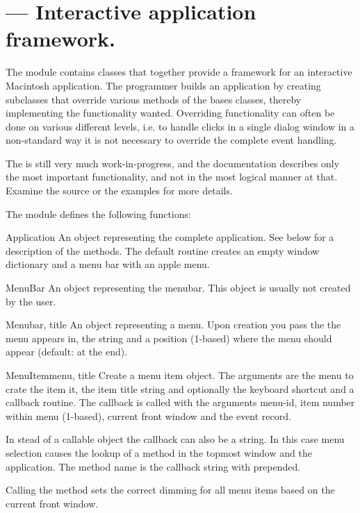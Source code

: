 \section{ ---
         Interactive application framework.}



The  module contains classes that together provide a
framework for an interactive Macintosh application. The programmer
builds an application by creating subclasses that override various
methods of the bases classes, thereby implementing the functionality
wanted. Overriding functionality can often be done on various
different levels, i.e. to handle clicks in a single dialog window in a
non-standard way it is not necessary to override the complete event
handling.

The  is still very much work-in-progress, and the
documentation describes only the most important functionality, and not
in the most logical manner at that. Examine the source or the examples
for more details.

The  module defines the following functions:


\begin{funcdesc}{Application}{}
An object representing the complete application. See below for a
description of the methods. The default  routine
creates an empty window dictionary and a menu bar with an apple menu.
\end{funcdesc}

\begin{funcdesc}{MenuBar}{}
An object representing the menubar. This object is usually not created
by the user.
\end{funcdesc}

\begin{funcdesc}{Menu}{bar, title}
An object representing a menu. Upon creation you pass the
 the menu appears in, the  string and a
position (1-based)  where the menu should appear (default:
at the end).
\end{funcdesc}

\begin{funcdesc}{MenuItem}{menu, title}
Create a menu item object. The arguments are the menu to crate the
item it, the item title string and optionally the keyboard shortcut
and a callback routine. The callback is called with the arguments
menu-id, item number within menu (1-based), current front window and
the event record.

In stead of a callable object the callback can also be a string. In
this case menu selection causes the lookup of a method in the topmost
window and the application. The method name is the callback string
with  prepended.

Calling the   method sets the
correct dimming for all menu items based on the current front window.
\end{funcdesc}


